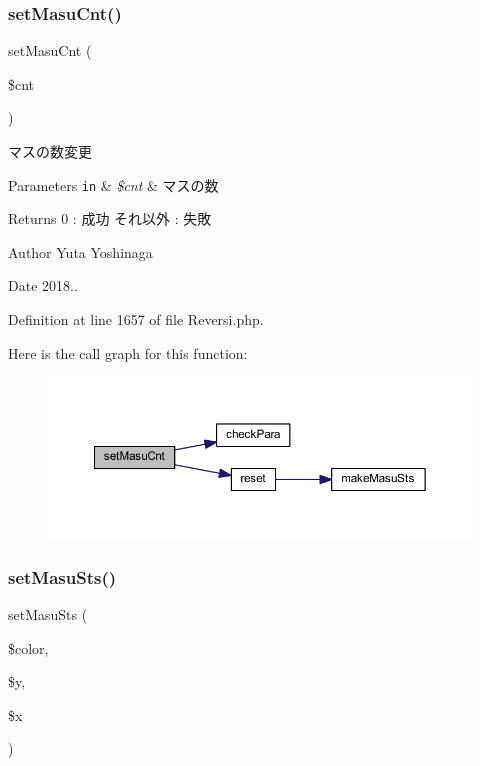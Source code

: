 \subsubsection{\texorpdfstring{set\+Masu\+Cnt()}{setMasuCnt()}}
{\footnotesize\ttfamily set\+Masu\+Cnt (\begin{DoxyParamCaption}\item[{}]{\$cnt }\end{DoxyParamCaption})}



マスの数変更 


\begin{DoxyParams}[1]{Parameters}
\mbox{\tt in}  & {\em \$cnt} & マスの数 \\
\hline
\end{DoxyParams}
\begin{DoxyReturn}{Returns}
0 \+: 成功 それ以外 \+: 失敗 
\end{DoxyReturn}
\begin{DoxyAuthor}{Author}
Yuta Yoshinaga 
\end{DoxyAuthor}
\begin{DoxyDate}{Date}
2018.. 
\end{DoxyDate}


Definition at line 1657 of file Reversi.\+php.

Here is the call graph for this function\+:
\nopagebreak
\begin{figure}[H]
\begin{center}
\leavevmode
\includegraphics[width=350pt]{class_reversi_ab6853cc0f53e50a70d576f15296f0864_cgraph}
\end{center}
\end{figure}
\mbox{\label{class_reversi_a26f3168c7d94e70d344841d65885a4ac}} 
\subsubsection{\texorpdfstring{set\+Masu\+Sts()}{setMasuSts()}}
{\footnotesize\ttfamily set\+Masu\+Sts (\begin{DoxyParamCaption}\item[{}]{\$color,  }\item[{}]{\$y,  }\item[{}]{\$x }\end{DoxyParamCaption})}



